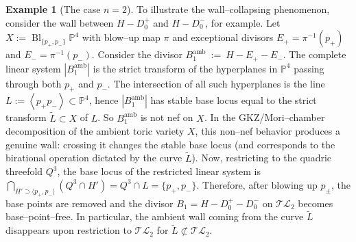 \documentclass[10pt]{amsart}
\theoremstyle{definition}
\newtheorem{example}[theorem]{Example}
\newcommand{\Bl}{\operatorname{Bl}}
\newcommand{\TL}{\mathcal{TL}}
\newcommand{\PP}{\mathbb{P}}
\theoremstyle{plain} %
\begin{document}
\begin{example}[The case $n=2$]
To illustrate the wall--collapsing phenomenon, consider the wall between 
$H-D_0^+$ and $H-D_0^-$, for example. Let $X:=\Bl_{\{p_+,p_-\}}\PP^4$ with blow--up map $\pi$ and exceptional divisors
$E_+=\pi^{-1}(p_+)$ and $E_-=\pi^{-1}(p_-)$. Consider the divisor $B^{\mathrm{amb}}_1 \ :=\ H-E_+-E_-$. The complete linear system $|B^{\mathrm{amb}}_1|$ is the strict transform of the hyperplanes in $\PP^4$ passing through both $p_+$ and $p_-$. 
The intersection of all such hyperplanes is the line $L:=\left\langle p_+p_-\right\rangle\subset \PP^4$, hence $|B^{\mathrm{amb}}_1|$ has stable base locus equal to the strict transform $\widetilde L\subset X$ of $L$. So $B^{\mathrm{amb}}_1$ is not nef on $X$. In the GKZ/Mori--chamber decomposition of the ambient toric variety $X$, this non--nef behavior produces a genuine wall:
crossing it changes the stable base locus (and corresponds to the birational
operation dictated by the curve $\widetilde L$). Now, restricting to the quadric threefold $Q^3$, the base locus of the restricted linear system is $\bigcap_{H'\supset \langle p_+,p_-\rangle}(Q^3\cap H') = Q^3\cap L=\{p_+,p_-\}$.
Therefore, after blowing up $p_\pm$, the base points are removed and the divisor $B_1 = H-D_0^+-D_0^-$ on  
$\TL_2$ becomes base--point--free. In particular, the ambient wall coming from the curve $\widetilde L$ disappears upon restriction to $\TL_2$ for $\widetilde L\not\subset\TL_2$.
 

\end{example}
\end{document}
